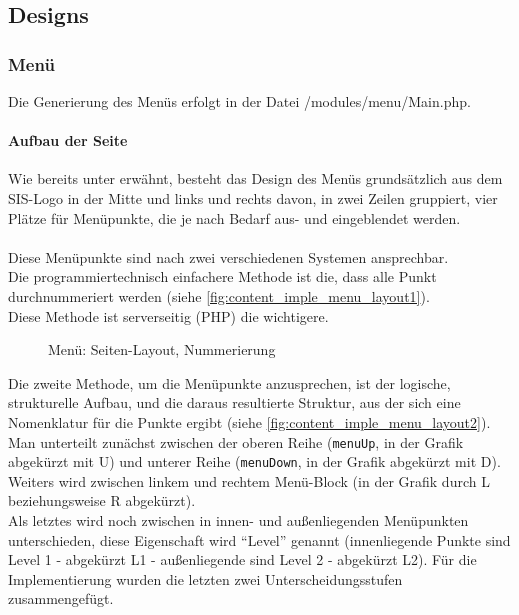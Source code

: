 \subsection{Designs}
\subsubsection{Menü}
Die Generierung des Menüs erfolgt in der Datei /modules/menu/Main.php.\\
\paragraph{Aufbau der Seite\\}
Wie bereits unter  erwähnt, besteht das Design des Menüs grundsätzlich aus dem SIS-Logo in der Mitte und links und rechts davon, in zwei Zeilen gruppiert, vier Plätze für Menüpunkte, die je nach Bedarf aus- und eingeblendet werden.\\
\\
Diese Menüpunkte sind nach zwei verschiedenen Systemen ansprechbar.\\
Die programmiertechnisch einfachere Methode ist die, dass alle Punkt durchnummeriert werden (siehe \autoref{fig:content_imple_menu_layout1}).\\ Diese Methode ist serverseitig (PHP) die wichtigere.
\begin{figure}[H]
\centering
{}
\caption{Menü: Seiten-Layout, Nummerierung}
\label{fig:content_imple_menu_layout1}
\end{figure}
Die zweite Methode, um die Menüpunkte anzusprechen, ist der logische, strukturelle Aufbau, und die daraus resultierte Struktur, aus der sich eine Nomenklatur für die Punkte ergibt (siehe \autoref{fig:content_imple_menu_layout2}).\\
Man unterteilt zunächst zwischen der oberen Reihe (\texttt{menuUp}, in der Grafik abgekürzt mit U) und unterer Reihe (\texttt{menuDown}, in der Grafik abgekürzt mit D).\\
Weiters wird zwischen linkem und rechtem Menü-Block (in der Grafik durch L beziehungsweise R abgekürzt).\\
Als letztes wird noch zwischen in innen- und außenliegenden Menüpunkten unterschieden, diese Eigenschaft wird \enquote{Level} genannt (innenliegende Punkte sind Level 1 - abgekürzt L1 - außenliegende sind Level 2 - abgekürzt L2). Für die Implementierung wurden die letzten zwei Unterscheidungsstufen zusammengefügt.\\
